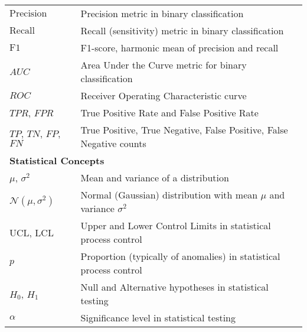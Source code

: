 \begin{appendices}
\begin{table}[htbp]
{\begin{tabular}{p{}p{}}
        $\text{Precision}$                             & Precision metric in binary classification                                            \\
        $\text{Recall}$                                & Recall (sensitivity) metric in binary classification                                 \\
        $\text{F1}$                                    & F1-score, harmonic mean of precision and recall                                      \\
        $AUC$                                          & Area Under the Curve metric for binary classification                                \\
        $ROC$                                          & Receiver Operating Characteristic curve                                              \\
        $TPR$, $FPR$                                   & True Positive Rate and False Positive Rate                                           \\
        $TP$, $TN$, $FP$, $FN$                         & True Positive, True Negative, False Positive, False Negative counts                  \\
        \midrule
        \multicolumn{2}{l}{\textbf{Statistical Concepts}}                                                                                     \\
        \midrule
        $\mu$, $\sigma^2$                              & Mean and variance of a distribution                                                  \\
        $\mathcal{N}(\mu,\sigma^2)$                    & Normal (Gaussian) distribution with mean $\mu$ and variance $\sigma^2$               \\
        $\text{UCL}$, $\text{LCL}$                     & Upper and Lower Control Limits in statistical process control                        \\
        $p$                                            & Proportion (typically of anomalies) in statistical process control                   \\
        $H_0$, $H_1$                                   & Null and Alternative hypotheses in statistical testing                               \\ %
        $\alpha$                                       & Significance level in statistical testing                                            \\

\end{tabular}}
\end{table}
\end{appendices}
